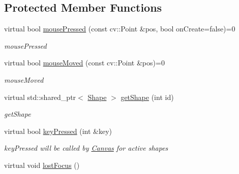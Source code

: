 \subsection*{Protected Member Functions}
\begin{DoxyCompactItemize}
\item 
virtual bool \hyperlink{classcanvascv_1_1Shape_aa332adef968829dd7744cb1f6a491879}{mouse\+Pressed} (const cv\+::\+Point \&pos, bool on\+Create=false)=0
\begin{DoxyCompactList}\small\item\em mouse\+Pressed \end{DoxyCompactList}\item 
virtual bool \hyperlink{classcanvascv_1_1Shape_acc72c3f645927c135dbc589e2c8678d4}{mouse\+Moved} (const cv\+::\+Point \&pos)=0
\begin{DoxyCompactList}\small\item\em mouse\+Moved \end{DoxyCompactList}\item 
virtual std\+::shared\+\_\+ptr$<$ \hyperlink{classcanvascv_1_1Shape}{Shape} $>$ \hyperlink{classcanvascv_1_1Shape_a89e585b5a1099f5ce291ded14db7181d}{get\+Shape} (int id)
\begin{DoxyCompactList}\small\item\em get\+Shape \end{DoxyCompactList}\item 
virtual bool \hyperlink{classcanvascv_1_1Shape_a7419dc43b9be99010e2b3bb973efbd37}{key\+Pressed} (int \&key)
\begin{DoxyCompactList}\small\item\em key\+Pressed will be called by \hyperlink{classcanvascv_1_1Canvas}{Canvas} for active shapes \end{DoxyCompactList}\item 
virtual void \hyperlink{classcanvascv_1_1Shape_a9682a16069302dfc183ba04f7ad512db}{lost\+Focus} ()\hypertarget{classcanvascv_1_1Shape_a9682a16069302dfc183ba04f7ad512db}{}\label{classcanvascv_1_1Shape_a9682a16069302dfc183ba04f7ad512db}


\end{DoxyCompactItemize}
